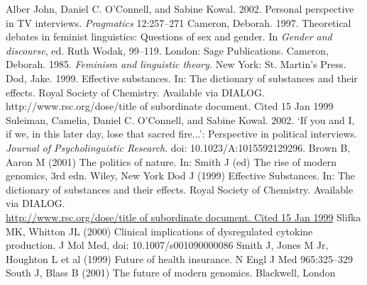 \documentclass[graybox,envcountchap,sectrefs]{svmono}
\begin{document}
\begin{thebibliography}{99.}
	 Alber John, Daniel C. O'Connell, and Sabine Kowal. 2002. Personal perspective in TV interviews. \textit{Pragmatics} 12:257--271
	 Cameron, Deborah. 1997. Theoretical debates in feminist linguistics: Questions of sex and gender. In \textit{Gender and discourse}, ed. Ruth Wodak, 99--119. London: Sage Publications.
	 Cameron, Deborah. 1985. \textit{Feminism and linguistic theory.} New York: St. Martin's Press.
	 Dod, Jake. 1999. Effective substances. In: The dictionary of substances and their effects. Royal Society of Chemistry. Available via DIALOG. \\
	http://www.rsc.org/dose/title of subordinate document. Cited 15 Jan 1999
	 Suleiman, Camelia, Daniel C. O'Connell, and Sabine Kowal. 2002. `If you and I, if we, in this later day, lose that sacred fire...': Perspective in political interviews. \textit{Journal of Psycholinguistic Research}. doi: 10.1023/A:1015592129296.
	\bigskip
	 Brown B, Aaron M (2001) The politics of nature. In: Smith J (ed) The rise of modern genomics, 3rd edn. Wiley, New York 
	 Dod J (1999) Effective Substances. In: The dictionary of substances and their effects. Royal Society of Chemistry. Available via DIALOG. \\
	\url{http://www.rsc.org/dose/title of subordinate document. Cited 15 Jan 1999}
	 Slifka MK, Whitton JL (2000) Clinical implications of dysregulated cytokine production. J Mol Med, doi: 10.1007/s001090000086
	 Smith J, Jones M Jr, Houghton L et al (1999) Future of health insurance. N Engl J Med 965:325--329
	 South J, Blass B (2001) The future of modern genomics. Blackwell, London 
\end{thebibliography}
	
\end{document}
